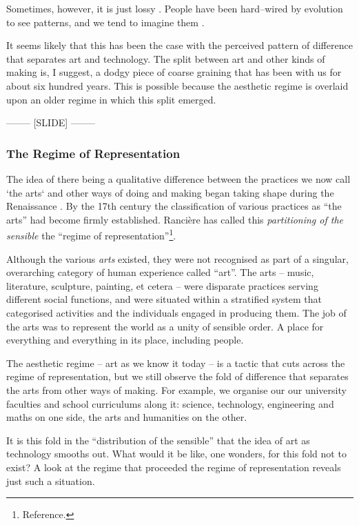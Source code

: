 \documentclass[letter:wpaper]{article}
\begin{document}
    Sometimes, however, it is just lossy \citep[p.8]{FlackCrsGrnng2017}. People have been hard–wired by evolution to see patterns, and we tend to imagine them \citep{FristonThFrEnrgPrncpl2010}.
    
    It seems likely that this has been the case with the perceived pattern of difference that separates art and technology. The split between art and other kinds of making is, I suggest, a dodgy piece of coarse graining that has been with us for about six hundred years. This is possible because the aesthetic regime is overlaid upon an older regime in which this split emerged. 
    
-------- [SLIDE] --------

    \subsubsection{The Regime of Representation}

    The idea of there being a qualitative difference between the practices we now call ‘the arts‘ and other ways of doing and making began taking shape during the Renaissance \citep[p.136]{TatarkiewiczWhtIsArt1971}. By the 17th century the classification of various practices as ``the arts'' had become firmly established. Rancière has called this \emph{partitioning of the sensible} the ``regime of representation''\footnote{
        Reference.
    }.
    
    Although the various \emph{arts} existed, they were not recognised as part of a singular, overarching category of human experience called ``art''. The arts – music, literature, sculpture, painting, et cetera – were disparate practices serving different social functions, and were situated within a stratified system that categorised activities and the individuals engaged in producing them. The job of the arts was to represent the world as a unity of sensible order. A place for everything and everything in its place, including people.
    
    The aesthetic regime -- art as we know it today -- is a tactic that cuts across the regime of representation, but we still observe the fold of difference that separates the arts from other ways of making. For example, we organise our our university faculties and school curriculums along it: science, technology, engineering and maths on one side, the arts and humanities on the other. 
    
    It is this fold in the ``distribution of the sensible'' \citep[p.42]{RancierPltcsOfThAsthtcs2004} that the idea of art as technology smooths out. What would it be like, one wonders, for this fold not to exist? A look at the regime that proceeded the regime of representation reveals just such a situation.
    
\end{document}
